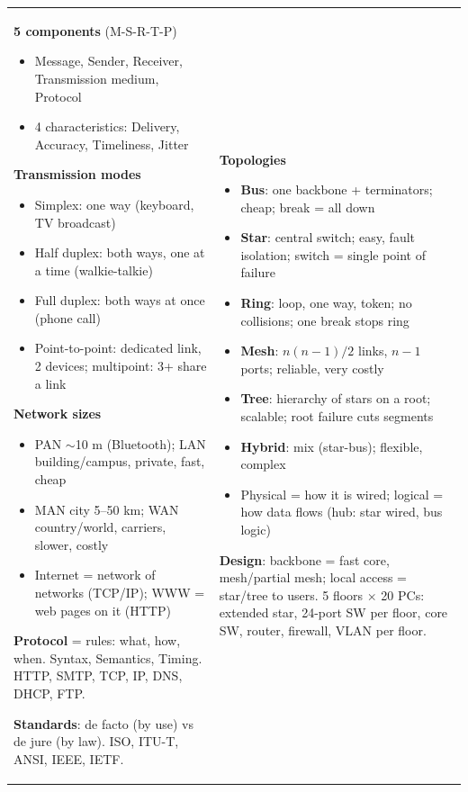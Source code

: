 \documentclass[10pt]{article}
\begin{document}
\newpage
\begin{cheatsheet}
\small
\begin{tabularx}{\linewidth}{@{}XX@{}}
\textbf{5 components} (M-S-R-T-P)
\begin{itemize}
\item Message, Sender, Receiver, Transmission medium, Protocol
\item 4 characteristics: Delivery, Accuracy, Timeliness, Jitter
\end{itemize}
\textbf{Transmission modes}
\begin{itemize}
\item Simplex: one way (keyboard, TV broadcast)
\item Half duplex: both ways, one at a time (walkie-talkie)
\item Full duplex: both ways at once (phone call)
\item Point-to-point: dedicated link, 2 devices; multipoint: 3+ share a link
\end{itemize}
\textbf{Network sizes}
\begin{itemize}
\item PAN $\sim$10 m (Bluetooth); LAN building/campus, private, fast, cheap
\item MAN city 5--50 km; WAN country/world, carriers, slower, costly
\item Internet = network of networks (TCP/IP); WWW = web pages on it (HTTP)
\end{itemize}
\textbf{Protocol} = rules: what, how, when. Syntax, Semantics, Timing. HTTP, SMTP, TCP, IP, DNS, DHCP, FTP.\par
\textbf{Standards}: de facto (by use) vs de jure (by law). ISO, ITU-T, ANSI, IEEE, IETF.
&
\textbf{Topologies}
\begin{itemize}
\item \textbf{Bus}: one backbone + terminators; cheap; break = all down
\item \textbf{Star}: central switch; easy, fault isolation; switch = single point of failure
\item \textbf{Ring}: loop, one way, token; no collisions; one break stops ring
\item \textbf{Mesh}: $n(n-1)/2$ links, $n-1$ ports; reliable, very costly
\item \textbf{Tree}: hierarchy of stars on a root; scalable; root failure cuts segments
\item \textbf{Hybrid}: mix (star-bus); flexible, complex
\item Physical = how it is wired; logical = how data flows (hub: star wired, bus logic)
\end{itemize}
\textbf{Design}: backbone = fast core, mesh/partial mesh; local access = star/tree to users. 5 floors $\times$ 20 PCs: extended star, 24-port SW per floor, core SW, router, firewall, VLAN per floor.


\end{tabularx}
\end{cheatsheet}
\end{document}
